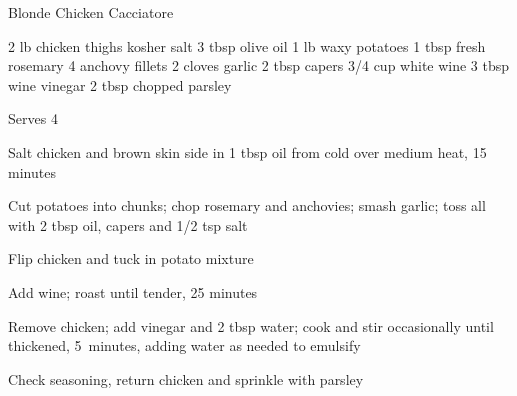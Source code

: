 \begin{denserecipe}{Blonde Chicken Cacciatore}{}
\begin{ingredients}
2 lb chicken thighs
kosher salt
3 tbsp olive oil
1 lb waxy potatoes
1 tbsp fresh rosemary
4 anchovy fillets
2 cloves garlic
2 tbsp capers
3/4 cup white wine
3 tbsp wine vinegar
2 tbsp chopped parsley
\end{ingredients}
\nextcolumn
Serves 4
\begin{steps}
    \item Salt chicken and brown skin side in 1 tbsp oil from cold over medium heat, 15 minutes
    \item Cut potatoes into chunks; chop rosemary and anchovies; smash garlic; toss all with 2 tbsp oil, capers and 1/2 tsp salt
    \item Flip chicken and tuck in potato mixture
    \item Add wine; roast until tender, 25 minutes
    \item Remove chicken; add vinegar and 2 tbsp water; cook and stir occasionally until thickened, 5~minutes, adding water as needed to emulsify
    \item Check seasoning, return chicken and sprinkle with parsley
\end{steps}
\end{denserecipe}

